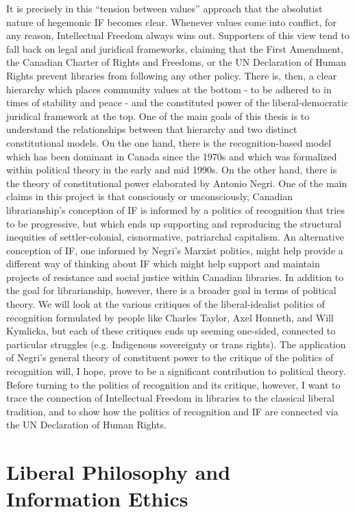 \documentclass[12pt,oneside]{memoir}
\begin{document}
It is precisely in this ``tension between values'' approach that the absolutist nature of hegemonic IF becomes clear. Whenever values come into conflict, for any reason, Intellectual Freedom always wins out. Supporters of this view tend to fall back on legal and juridical frameworks, claiming that the First Amendment, the Canadian Charter of Rights and Freedoms, or the UN Declaration of Human Rights prevent libraries from following any other policy. There is, then, a clear hierarchy which places community values at the bottom - to be adhered to in times of stability and peace - and the constituted power of the liberal-democratic juridical framework at the top. One of the main goals of this thesis is to understand the relationships between that hierarchy and two distinct constitutional models. On the one hand, there is the recognition-based model which has been dominant in Canada since the 1970s and which was formalized within political theory in the early and mid 1990s. On the other hand, there is the theory of constitutional power elaborated by Antonio Negri. One of the main claims in this project is that consciously or unconsciously, Canadian librarianship's conception of IF is informed by a politics of recognition that tries to be progressive, but which ends up supporting and reproducing the structural inequities of settler-colonial, cisnormative, patriarchal capitalism. An alternative conception of IF, one informed by Negri's Marxist politics, might help provide a different way of thinking about IF which might help support and maintain projects of resistance and social justice within Canadian libraries.
In addition to the goal for librarianship, however, there is a broader goal in terms of political theory. We will look at the various critiques of the liberal-idealist politics of recognition formulated by people like Charles Taylor, Axel Honneth, and Will Kymlicka, but each of these critiques ends up seeming one-sided, connected to particular struggles (e.g. Indigenous sovereignty or trans rights). The application of Negri's general theory of constituent power to the critique of the politics of recognition will, I hope, prove to be a significant contribution to political theory. Before turning to the politics of recognition and its critique, however, I want to trace the connection of Intellectual Freedom in libraries to the classical liberal tradition, and to show how the politics of recognition and IF are connected via the UN Declaration of Human Rights.

\section{Liberal Philosophy and Information Ethics}
\label{scrivauto:7}

\backmatter

 

\end{document}
